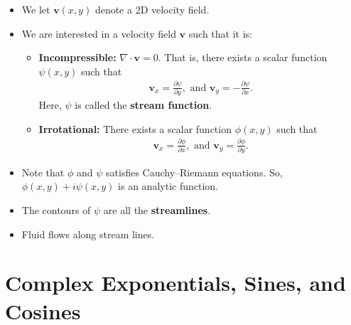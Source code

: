 \documentclass[10pt]{article}
\newcommand{\ve}[1]{\mathbf{#1}}
\begin{document}
  \begin{itemize}
    \item We let $\ve{v}(x,y)$ denote a 2D velocity field.

    \item We are interested in a velocity field $\ve{v}$ such that it is:
      \begin{itemize}
        \item {\bf Incompressible:} $\nabla \cdot \ve{v} = 0$. That is, there exists a scalar function $\psi(x,y)$ such that
        \begin{align*}
          \ve{v}_x = \frac{\partial \psi}{\partial y}, \mbox{ and } \ve{v}_y = -\frac{\partial \psi}{\partial x}.
        \end{align*}
        Here, $\psi$ is called the {\bf stream function}.

        \item {\bf Irrotational:} There exists a scalar function $\phi(x,y)$ such that
        \begin{align*}
          \ve{v}_x = \frac{\partial \phi}{\partial x}, \mbox{ and } \ve{v}_y = \frac{\partial \phi}{\partial y}.
        \end{align*}
      \end{itemize}

    \item Note that $\phi$ and $\psi$ satisfies Cauchy--Riemann equations. So, $\phi(x,y) + i \psi(x,y)$ is an analytic function.

    \item The contours of $\psi$ are all the {\bf streamlines}.
    
    \item Fluid flows along stream lines.
  \end{itemize}  

  \section{Complex Exponentials, Sines, and Cosines} %
  \label{sec:exp_sin_cos}
\end{document}
